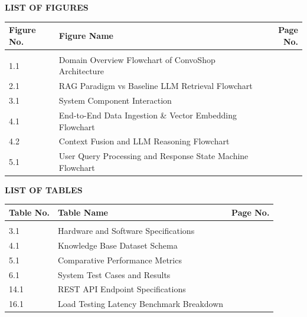 \documentclass[12pt,a4paper]{article}
\begin{document}
\newpage

\label{page:lof}
\begin{center}
{\fontsize{16}{20}\bfseries\color{vtuBlue} LIST OF FIGURES\\[10pt]}
\end{center}

\noindent
\begin{longtable}{@{} p{2.2cm} p{11.8cm} r @{}}
\textbf{Figure No.} & \textbf{Figure Name} & \textbf{Page No.} \\[4pt]
\hline \\[-6pt]
1.1 & Domain Overview Flowchart of ConvoShop Architecture & \pageref{fig:1_1} \\[6pt]
2.1 & RAG Paradigm vs Baseline LLM Retrieval Flowchart & \pageref{fig:2_1} \\[6pt]
3.1 & System Component Interaction & \pageref{fig:3_1} \\[6pt]
4.1 & End-to-End Data Ingestion \& Vector Embedding Flowchart & \pageref{fig:4_1} \\[6pt]
4.2 & Context Fusion and LLM Reasoning Flowchart & \pageref{fig:4_2} \\[6pt]
5.1 & User Query Processing and Response State Machine Flowchart & \pageref{fig:5_1} \\[6pt]
\end{longtable}

\newpage

\label{page:lot}
\begin{center}
{\fontsize{16}{20}\bfseries\color{vtuBlue} LIST OF TABLES\\[10pt]}
\end{center}

\noindent
\begin{longtable}{@{} p{2.2cm} p{11.8cm} r @{}}
\textbf{Table No.} & \textbf{Table Name} & \textbf{Page No.} \\[4pt]
\hline \\[-6pt]
3.1 & Hardware and Software Specifications & \pageref{tab:3_1} \\[6pt]
4.1 & Knowledge Base Dataset Schema & \pageref{tab:4_1} \\[6pt]
5.1 & Comparative Performance Metrics & \pageref{tab:5_1} \\[6pt]
6.1 & System Test Cases and Results & \pageref{tab:6_1} \\[6pt]
14.1 & REST API Endpoint Specifications & \pageref{tab:14_1} \\[6pt]
16.1 & Load Testing Latency Benchmark Breakdown & \pageref{tab:16_1} \\[6pt]
\end{longtable}
\end{document}
